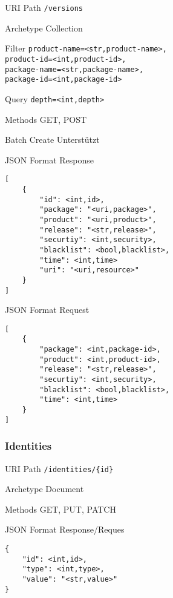 \documentclass[10pt,a4paper]{scrartcl}
\begin{document}
\begin{mdframed}[style=def]
\begin{description*}
	\item[URI Path] \texttt{/versions}
	\item[Archetype] Collection
	\item[Filter] \texttt{product-name=<str,product-name>,\\
	product-id=<int,product-id>,\\
	package-name=<str,package-name>,\\
	package-id=<int,package-id>}
	\item[Query] \texttt{depth=<int,depth>}
	\item[Methods] GET, POST
	\item[Batch Create] Unterstützt
	\item[JSON Format Response] \hfill
\begin{lstlisting}
[
	{
		"id": <int,id>,
		"package": "<uri,package>",
		"product": "<uri,product>",
		"release": "<str,release>",
		"securtiy": <int,security>,
		"blacklist": <bool,blacklist>,
		"time": <int,time>
		"uri": "<uri,resource>"
	}
]
\end{lstlisting}
	\item[JSON Format Request] \hfill
\begin{lstlisting}
[
	{
		"package": <int,package-id>,
		"product": <int,product-id>,
		"release": "<str,release>",
		"securtiy": <int,security>,
		"blacklist": <bool,blacklist>,
		"time": <int,time>
	}
]
\end{lstlisting}
\end{description*}
\end{mdframed}


\pagebreak
\subsubsection{Identities}
\begin{mdframed}[style=def]
\begin{description*}
	\item[URI Path] \texttt{/identities/\{id\}}
	\item[Archetype] Document
	\item[Methods] GET, PUT, PATCH
	\item[JSON Format Response/Reques] \hfill
\begin{lstlisting}
{
	"id": <int,id>,
	"type": <int,type>,
	"value": "<str,value>"
}
\end{lstlisting}
\end{description*}
\end{mdframed}
\end{document}
